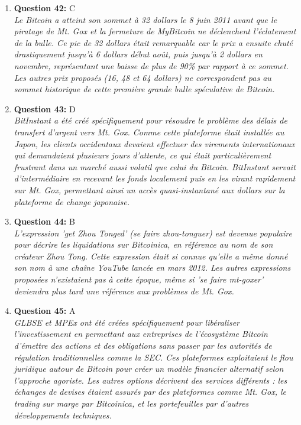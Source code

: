 \documentclass[12pt,a4paper]{article}
\begin{document}
\begin{enumerate}
\item \textbf{Question 42:} C
\\ \textit{Le Bitcoin a atteint son sommet à 32 dollars le 8 juin 2011 avant que le piratage de Mt. Gox et la fermeture de MyBitcoin ne déclenchent l'éclatement de la bulle. Ce pic de 32 dollars était remarquable car le prix a ensuite chuté drastiquement jusqu'à 6 dollars début août, puis jusqu'à 2 dollars en novembre, représentant une baisse de plus de 90\% par rapport à ce sommet. Les autres prix proposés (16, 48 et 64 dollars) ne correspondent pas au sommet historique de cette première grande bulle spéculative de Bitcoin.}

\item \textbf{Question 43:} D
\\ \textit{BitInstant a été créé spécifiquement pour résoudre le problème des délais de transfert d'argent vers Mt. Gox. Comme cette plateforme était installée au Japon, les clients occidentaux devaient effectuer des virements internationaux qui demandaient plusieurs jours d'attente, ce qui était particulièrement frustrant dans un marché aussi volatil que celui du Bitcoin. BitInstant servait d'intermédiaire en recevant les fonds localement puis en les virant rapidement sur Mt. Gox, permettant ainsi un accès quasi-instantané aux dollars sur la plateforme de change japonaise.}

\item \textbf{Question 44:} B
\\ \textit{L'expression 'get Zhou Tonged' (se faire zhou-tonguer) est devenue populaire pour décrire les liquidations sur Bitcoinica, en référence au nom de son créateur Zhou Tong. Cette expression était si connue qu'elle a même donné son nom à une chaîne YouTube lancée en mars 2012. Les autres expressions proposées n'existaient pas à cette époque, même si 'se faire mt-goxer' deviendra plus tard une référence aux problèmes de Mt. Gox.}

\item \textbf{Question 45:} A
\\ \textit{GLBSE et MPEx ont été créées spécifiquement pour libéraliser l'investissement en permettant aux entreprises de l'écosystème Bitcoin d'émettre des actions et des obligations sans passer par les autorités de régulation traditionnelles comme la SEC. Ces plateformes exploitaient le flou juridique autour de Bitcoin pour créer un modèle financier alternatif selon l'approche agoriste. Les autres options décrivent des services différents : les échanges de devises étaient assurés par des plateformes comme Mt. Gox, le trading sur marge par Bitcoinica, et les portefeuilles par d'autres développements techniques.}


\end{enumerate}
\end{document}
